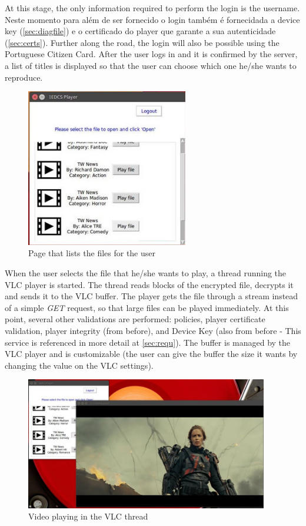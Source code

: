 \documentclass[11pt,a4paper]{report}
\begin{document}
At this stage, the only information required to perform the login is the username. Neste momento para além de ser fornecido o login também é fornecidada a device key (\autoref{sec:diagfile}) e o certificado do player que garante a sua autenticidade (\autoref{sec:certs}).
Further along the road, the login will also be possible using the Portuguese Citizen Card.
\newline After the user logs in and it is confirmed by the server, a list of titles is displayed so that the user can choose which one he/she wants to reproduce.

\begin{figure}[H]
\centerline{\includegraphics[width=200pt]{images/playerList.jpg}}
\caption{Page that lists the files for the user}
\label{player}
\end{figure}

When the user selects the file that he/she wants to play, a thread running the VLC player is started. The thread reads blocks of the encrypted file, decrypts it and sends it to the VLC buffer.
The player gets the file through a stream instead of a simple \emph{GET} request, so that large files can be played immediately.
At this point, several other validations are performed: policies, player certificate validation, player integrity (from before), and Device Key (also from before - This service is referenced in more detail at \autoref{sec:requ}).
\newline
The buffer is managed by the VLC player and is customizable (the user can give the buffer the size it wants by changing the value on the VLC settings).

\begin{figure}[H]
\centerline{\includegraphics[width=300pt]{images/playerPlay.jpg}}
\caption{Video playing in the VLC thread}
\label{player}
\end{figure}
\end{document}
